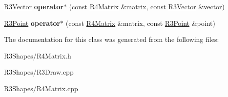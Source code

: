 \begin{DoxyCompactItemize}
\item 
\hyperlink{class_r3_vector}{R3\+Vector} {\bfseries operator$\ast$} (const \hyperlink{class_r4_matrix}{R4\+Matrix} \&matrix, const \hyperlink{class_r3_vector}{R3\+Vector} \&vector)\hypertarget{class_r4_matrix_a16fdd1bb2aa8addb521790bd204edbbf}{}\label{class_r4_matrix_a16fdd1bb2aa8addb521790bd204edbbf}

\item 
\hyperlink{class_r3_point}{R3\+Point} {\bfseries operator$\ast$} (const \hyperlink{class_r4_matrix}{R4\+Matrix} \&matrix, const \hyperlink{class_r3_point}{R3\+Point} \&point)\hypertarget{class_r4_matrix_ad2d46f988de5b9615dc276265ce5faff}{}\label{class_r4_matrix_ad2d46f988de5b9615dc276265ce5faff}

\end{DoxyCompactItemize}


The documentation for this class was generated from the following files\+:\begin{DoxyCompactItemize}
\item 
R3\+Shapes/R4\+Matrix.\+h\item 
R3\+Shapes/R3\+Draw.\+cpp\item 
R3\+Shapes/R4\+Matrix.\+cpp\end{DoxyCompactItemize}
